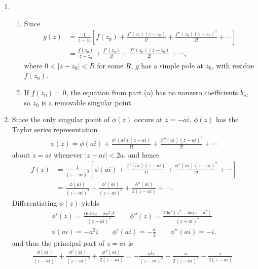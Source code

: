 \documentclass[a4paper,12pt]{article}
\begin{document}
\begin{enumerate}
    \item
        \begin{enumerate}
            \item
                Since
                \begin{align*}
                    g(z) &= \frac{1}{z - z_0} \left[ f(z_0) + \frac{f'(z_0)(z - z_0)}{1!} + \frac{f''(z_0)(z - z_0)^2}{2!} + \cdots \right] \\
                    &= \frac{f(z_0)}{z - z_0} + \frac{f'(z_0)}{1!} + \frac{f''(z_0)(z - z_0)}{2!} + \cdots,
                \end{align*}
                where $0 < |z - z_0| < R$ for some $R$, $g$ has a simple pole at $z_0$, with residue $f(z_0)$.

            \item
                If $f(z_0) = 0$, the equation from part (a) has no nonzero coefficients $b_n$, so $z_0$ is a removable singular point.
        \end{enumerate}

    \item
        Since the only singular point of $\phi(z)$ occurs at $z = -ai$, $\phi(z)$ has the Taylor series representation
        \begin{align*}
            \phi(z) = \phi(ai) + \frac{\phi'(ai)(z - ai)}{1!} + \frac{\phi''(ai)(z - ai)^2}{2!} + \cdots
        \end{align*}
        about $z = ai$ whenever $|z - ai| < 2a$, and hence
        \begin{align*}
            f(z) &= \frac{1}{(z - ai)^3} \left[ \phi(ai) + \frac{\phi'(ai)(z - ai)}{1!} + \frac{\phi''(ai)(z - ai)^2}{2!} + \cdots \right] \\
            &= \frac{\phi(ai)}{(z - ai)^3} + \frac{\phi'(ai)}{(z - ai)^2} + \frac{\phi''(ai)}{2(z - ai)} + \cdots.
        \end{align*}
        Differentiating $\phi(z)$ yields
        \begin{gather*}
            \phi'(z) = \frac{16a^4iz - 8a^3z^2}{(z + ai)^4} \qquad
            \phi''(z) = \frac{16a^3(z^2 - 4aiz - a^2)}{(z + ai)^5} \\
            \phi(ai) = -a^2 i \qquad \phi'(ai) = -\frac{a}{2} \qquad \phi''(ai) = -i.
        \end{gather*}
        and thus the principal part of $z = ai$ is
        \begin{align*}
            \frac{\phi(ai)}{(z - ai)^3} + \frac{\phi'(ai)}{(z - ai)^2} + \frac{\phi''(ai)}{2(z - ai)} = -\frac{a^2 i}{(z - ai)^3} - \frac{a}{2(z - ai)^2} - \frac{i}{2(z - ai)}.
        \end{align*}
\end{enumerate}
\end{document}
